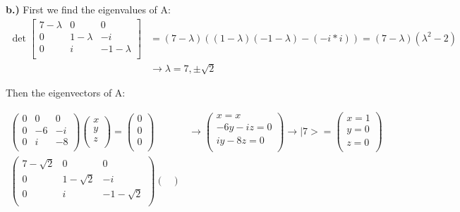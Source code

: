 \documentclass[10pt]{article} %
\newcommand{\ket}[1]{\big|#1\big>}
\begin{document}
\textbf{b.)}
First we find the eigenvalues of A:
\begin{align*}
  \det
  \begin{bmatrix}
    7 -\lambda& 0 & 0\\
    0 & 1 -\lambda& -i\\
    0 & i & -1 -\lambda\\
  \end{bmatrix}
  &= (7-\lambda)\left((1-\lambda)(-1-\lambda) - (-i*i)\right) = \left(7-\lambda\right)\left(\lambda^2-2\right)\\
  &\rightarrow \lambda = 7, \pm\sqrt{2} 
\end{align*}

Then the eigenvectors of A:

\begin{align*}
  \begin{pmatrix}
    0 & 0 & 0\\
    0 & -6 & -i\\
    0 & i & -8\\
  \end{pmatrix}
  \begin{pmatrix}
    x\\
    y\\
    z\\
  \end{pmatrix}
  =
  \begin{pmatrix}
    0\\
    0\\
    0\\
  \end{pmatrix}
  &
  \rightarrow
  \begin{pmatrix}
    x = x\\
    -6y-iz = 0\\
    iy - 8z = 0\\
  \end{pmatrix}
  \rightarrow
  \ket{7} =
  \begin{pmatrix}
    x = 1\\
    y = 0\\
    z = 0\\
  \end{pmatrix}\\
  \begin{pmatrix}
    7 - \sqrt{2} & 0 & 0\\
    0 & 1-\sqrt{2} & -i\\
    0 & i & -1-\sqrt{2}\\
  \end{pmatrix}
  \begin{pmatrix}

\end{pmatrix}
\end{align*}
\end{document}
